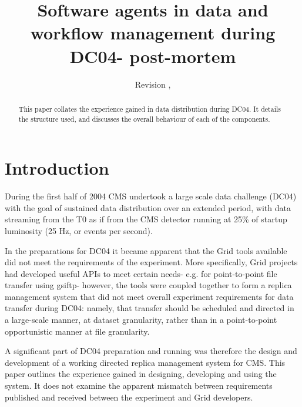 \documentclass{cmspaper}
\begin{document}
\begin{titlepage}
  \date{Revision \RCSRevision, \RCSDate}
  \title{Software agents in data and workflow management during DC04- post-mortem}

  \begin{Authlist}
  \end{Authlist}


  \begin{abstract}
	This paper collates the experience gained in data distribution during
	DC04. It details the structure used, and discusses the overall behaviour
	of each of the components.
  \end{abstract} 

\end{titlepage}

\setcounter{page}{2}

\section{Introduction}
During the first half of 2004 CMS undertook a large scale data challenge (DC04) with the goal of sustained data distribution over an extended period, with data streaming from the T0 as if from the CMS detector running at 25\% of startup luminosity (25 Hz, or events per second).

In the preparations for DC04 it became apparent that the Grid tools available did not meet the requirements of the experiment. More specifically, Grid projects had developed useful APIs to meet certain needs- e.g. for point-to-point file transfer using gsiftp- however, the tools were coupled together to form a replica management system that did not meet overall experiment requirements for data transfer during DC04: namely, that transfer should be scheduled and directed in a large-scale manner, at dataset granularity, rather than in a point-to-point opportunistic manner at file granularity.

A significant part of DC04 preparation and running was therefore the design and development of a working directed replica management system for CMS. This paper outlines the experience gained in designing, developing and using the system. It does not examine the apparent mismatch between requirements published and received between the experiment and Grid developers.
\end{document}
